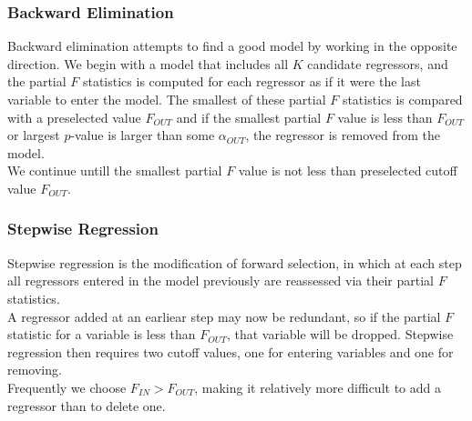 \documentclass[11pt]{article}
\theoremstyle{definition}
\begin{document}
\subsubsection{Backward Elimination}
Backward elimination attempts to find a good model by working in the opposite direction. We begin with a model that includes all $K$ candidate regressors, and the partial $F$ statistics is computed for each regressor as if it were the last variable to enter the model. The smallest of these partial $F$ statistics is compared with a preselected value $F_{OUT}$ and if the smallest partial $F$ value is less than $F_{OUT}$ or largest $p$-value is larger than some $\alpha_{OUT}$, the regressor is removed from the model.\\
We continue untill the smallest partial $F$ value is not less than preselected cutoff value $F_{OUT}$.
\subsubsection{Stepwise Regression}
Stepwise regression is the modification of forward selection, in which at each step all regressors entered in the model previously are reassessed via their partial $F$ statistics.\\
A regressor added at an earliear step may now be redundant, so if the partial $F$ statistic for a variable is less than $F_{OUT}$, that variable will be dropped. Stepwise regression then requires two cutoff values, one for entering variables and one for removing.\\
Frequently we choose $F_{IN}>F_{OUT}$, making it relatively more difficult to add a regressor than to delete one.
\end{document}

